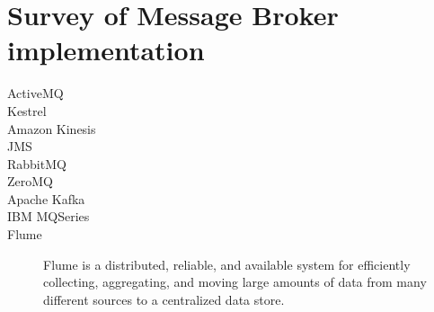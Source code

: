 \chapter{Survey of Message Broker implementation} 
\begin{description}
    \item [ActiveMQ]
    \item [Kestrel]
    \item [Amazon Kinesis]
    \item [JMS]
    \item [RabbitMQ]
    \item [ZeroMQ]
    \item [Apache Kafka]
    \item [IBM MQSeries]
    \item [Flume] Flume is a distributed, reliable, and available system for efficiently collecting, aggregating, and moving large amounts of data from many different sources to a centralized data store.
\end{description}


